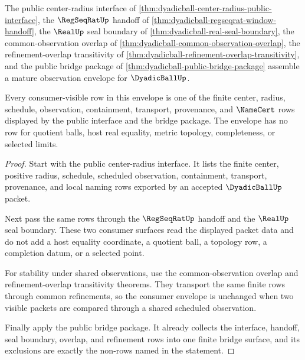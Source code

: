 \begin{theorem}
\label{thm:dyadicball-mature-observation-envelope}
The public center-radius interface of
\autoref{thm:dyadicball-center-radius-public-interface}, the
$\RegSeqRatUp$ handoff of
\autoref{thm:dyadicball-regseqrat-window-handoff}, the $\RealUp$ seal
boundary of \autoref{thm:dyadicball-real-seal-boundary}, the common-observation
overlap of \autoref{thm:dyadicball-common-observation-overlap}, the
refinement-overlap transitivity of
\autoref{thm:dyadicball-refinement-overlap-transitivity}, and the public bridge
package of \autoref{thm:dyadicball-public-bridge-package} assemble a mature
observation envelope for $\DyadicBallUp$.

Every consumer-visible row in this envelope is one of the finite center,
radius, schedule, observation, containment, transport, provenance, and
$\NameCert$ rows displayed by the public interface and the bridge package. The
envelope has no row for quotient balls, host real equality, metric topology,
completeness, or selected limits.
\end{theorem}
\begin{proof}
Start with the public center-radius interface. It lists the finite center,
positive radius, schedule, scheduled observation, containment, transport,
provenance, and local naming rows exported by an accepted $\DyadicBallUp$
packet.

Next pass the same rows through the $\RegSeqRatUp$ handoff and the $\RealUp$
seal boundary. These two consumer surfaces read the displayed packet data and
do not add a host equality coordinate, a quotient ball, a topology row, a
completion datum, or a selected point.

For stability under shared observations, use the common-observation overlap and
refinement-overlap transitivity theorems. They transport the same finite rows
through common refinements, so the consumer envelope is unchanged when two
visible packets are compared through a shared scheduled observation.

Finally apply the public bridge package. It already collects the interface,
handoff, seal boundary, overlap, and refinement rows into one finite bridge
surface, and its exclusions are exactly the non-rows named in the statement.
\end{proof}

